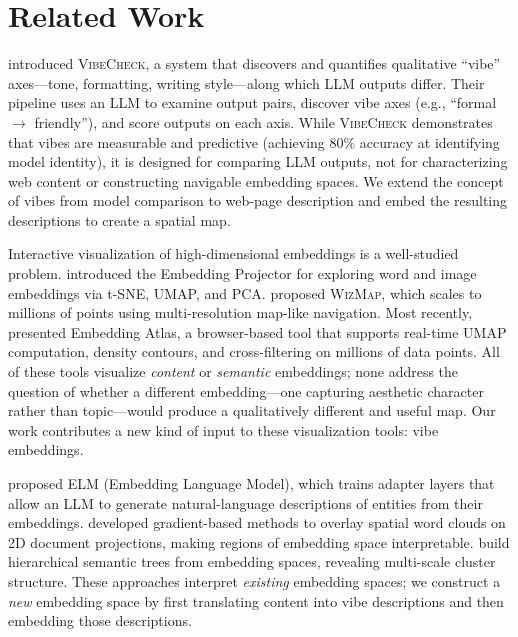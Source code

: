 \section{Related Work}
\label{sec:related}

\citet{dunlap2024vibecheck} introduced \textsc{VibeCheck}, a system that discovers and quantifies qualitative ``vibe'' axes---tone, formatting, writing style---along which LLM outputs differ.
Their pipeline uses an LLM to examine output pairs, discover vibe axes (e.g., ``formal $\to$ friendly''), and score outputs on each axis.
While \textsc{VibeCheck} demonstrates that vibes are measurable and predictive (achieving 80\% accuracy at identifying model identity), it is designed for comparing LLM outputs, not for characterizing web content or constructing navigable embedding spaces.
We extend the concept of vibes from model comparison to web-page description and embed the resulting descriptions to create a spatial map.

Interactive visualization of high-dimensional embeddings is a well-studied problem.
\citet{smilkov2016embedding} introduced the Embedding Projector for exploring word and image embeddings via t-SNE, UMAP, and PCA.
\citet{polo2023wizmap} proposed \textsc{WizMap}, which scales to millions of points using multi-resolution map-like navigation.
Most recently, \citet{ren2025embedding} presented Embedding Atlas, a browser-based tool that supports real-time UMAP computation, density contours, and cross-filtering on millions of data points.
All of these tools visualize \emph{content} or \emph{semantic} embeddings; none address the question of whether a different embedding---one capturing aesthetic character rather than topic---would produce a qualitatively different and useful map.
Our work contributes a new kind of input to these visualization tools: vibe embeddings.

\citet{tennenholtz2023demystifying} proposed ELM (Embedding Language Model), which trains adapter layers that allow an LLM to generate natural-language descriptions of entities from their embeddings.
\citet{liu2024visualizing} developed gradient-based methods to overlay spatial word clouds on 2D document projections, making regions of embedding space interpretable.
\citet{haschka2025multiscale} build hierarchical semantic trees from embedding spaces, revealing multi-scale cluster structure.
These approaches interpret \emph{existing} embedding spaces; we construct a \emph{new} embedding space by first translating content into vibe descriptions and then embedding those descriptions.

